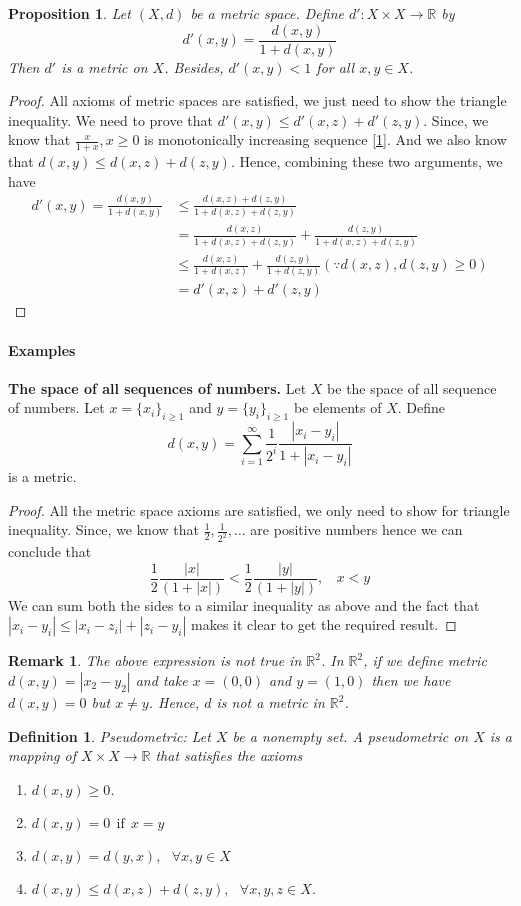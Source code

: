 \documentclass[12pt]{report}
\newtheorem{defn}{Definition}
\newtheorem*{rem}{Remark}
\newtheorem{prop}{Proposition}
\begin{document}
\begin{prop}
    Let $(X,d)$ be a metric space. Define $d':X \times X \to \mathbb{R}$ by 
    $$ d'(x,y) = \frac{d(x,y)}{1 + d(x,y)}$$
    Then $d'$ is a metric on $X$. Besides, $d'(x,y) < 1$ for all $x,y \in X$.
\end{prop}
\begin{proof}
    All axioms of metric spaces are satisfied, we just need to show the triangle inequality. We need to prove that $d'(x,y) \leq d'(x,z) + d'(z,y)$. Since, we know that $\frac{x}{1+x}, x\geq 0$ is monotonically increasing sequence \ref{1}. And we also know that $d(x,y) \leq d(x,z) + d(z,y)$. Hence, combining these two arguments, we have
    \begin{align*}
        d'(x,y) =  \frac{d(x,y)}{1 + d(x,y)} &\leq \frac{d(x,z) + d(z,y)}{1 + d(x,z) + d(z,y)}\\
        &= \frac{d(x,z)}{1 +  d(x,z) + d(z,y)} + \frac{d(z,y)}{1 +  d(x,z) + d(z,y)}\\
        &\leq \frac{d(x,z)}{1 +  d(x,z)} + \frac{d(z,y)}{1 +  d(z,y)}(\because d(x,z),d(z,y) \geq 0)\\
        &= d'(x,z) + d'(z,y)
    \end{align*}
\end{proof}
\paragraph*{Examples}
\textbf{The space of all sequences of numbers. } Let $X$ be the space of all sequence of numbers. Let $x = \{x_i\}_{i \geq 1}$ and $y = \{y_i\}_{i \geq 1}$ be elements of $X$. Define
$$ d(x,y) = \sum\limits_{i=1}^{\infty}\frac{1}{2^i}\frac{|x_i - y_i|}{1 + |x_i - y_i|}$$
is a metric.
\begin{proof}
    All the metric space axioms are satisfied, we only need to show for triangle inequality. Since, we know that $\frac{1}{2}, \frac{1}{2^2}, \dots$ are positive numbers hence we can conclude that
    $$ \frac{1}{2}\frac{|x|}{(1 + |x|)} < \frac{1}{2}\frac{|y|}{(1 + |y|)},~~~~x < y$$
    We can sum both the sides to a similar inequality as above and the fact that $|x_i - y_i| \leq |x_i - z_i| + |z_i - y_i|$ makes it clear to get the required result.    
\end{proof}
\begin{rem}
    The above expression is not true in $\mathbb{R}^2$. In $\mathbb{R}^2$, if we define metric $d(x,y) = |x_2 - y_2|$ and  take $x = (0,0)$ and $y = (1,0)$ then we have $d(x,y) = 0$ but $x \neq y$. Hence, $d$ is not a metric in $\mathbb{R}^2$.
\end{rem}
\begin{defn}
    Pseudometric: Let $X$ be a nonempty set. A pseudometric on $X$ is a mapping of $X \times X \to \mathbb{R}$ that satisfies the axioms
    \begin{enumerate}
        \item $d(x,y) \geq 0$.
        \item $d(x,y) = 0~~\text{if}~~ x = y$
        \item $ d(x,y) = d(y,x),~~~\forall x,y \in X$
        \item $d(x,y) \leq d(x,z) + d(z,y),~~~\forall x,y,z \in X$.
    \end{enumerate}
\end{defn}
\end{document}
